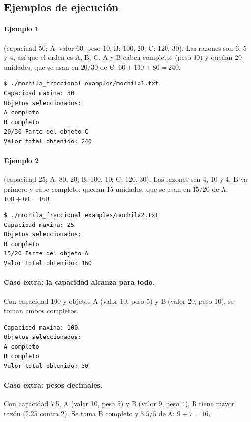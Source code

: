 \documentclass[11pt,a4paper]{article}
\begin{document}
\subsection{Ejemplos de ejecución}

\paragraph{Ejemplo 1} (capacidad 50; A: valor 60, peso 10; B: 100, 20; C: 120, 30). Las razones son 6, 5 y 4, así que el orden es A, B, C. A y B caben completos (peso 30) y quedan 20 unidades, que se usan en $20/30$ de C: $60 + 100 + 80 = 240$.

\begin{verbatim}
$ ./mochila_fraccional examples/mochila1.txt
Capacidad maxima: 50
Objetos seleccionados:
A completo
B completo
20/30 Parte del objeto C
Valor total obtenido: 240
\end{verbatim}

\paragraph{Ejemplo 2} (capacidad 25; A: 80, 20; B: 100, 10; C: 120, 30). Las razones son 4, 10 y 4. B va primero y cabe completo; quedan 15 unidades, que se usan en $15/20$ de A: $100 + 60 = 160$.

\begin{verbatim}
$ ./mochila_fraccional examples/mochila2.txt
Capacidad maxima: 25
Objetos seleccionados:
B completo
15/20 Parte del objeto A
Valor total obtenido: 160
\end{verbatim}

\paragraph{Caso extra: la capacidad alcanza para todo.} Con capacidad 100 y objetos A (valor 10, peso 5) y B (valor 20, peso 10), se toman ambos completos.

\begin{verbatim}
Capacidad maxima: 100
Objetos seleccionados:
A completo
B completo
Valor total obtenido: 30
\end{verbatim}

\paragraph{Caso extra: pesos decimales.} Con capacidad 7.5, A (valor 10, peso 5) y B (valor 9, peso 4), B tiene mayor razón (2.25 contra 2). Se toma B completo y $3.5/5$ de A: $9 + 7 = 16$.
\end{document}
